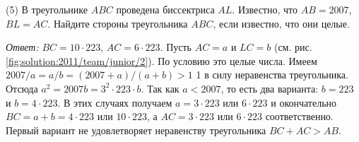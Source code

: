 \textsf{(5)}
В треугольнике $ABC$ проведена биссектриса $AL$.
Известно, что $AB = 2007$, $BL = AC$.
Найдите стороны треугольника $ABC$, если известно, что они целые.

%
\label{solution:2011/team/junior/2}%
\emph{Ответ:} $BC = 10 \cdot 223$, $AC = 6 \cdot 223$.
Пусть $AC = a$ и $LC = b$
(см. рис. \ref{fig:solution:2011/team/junior/2}).
По условию это целые числа.
Имеем $2007 / a = a / b = (2007 + a) / (a + b) > 1$ 1 в силу неравенства
треугольника.
Отсюда $a^2 = 2007 b = 3^2 \cdot 223 \cdot b$.
Так как  $a < 2007$, то есть два варианта:
$b = 223$ и $b = 4 \cdot 223$.
В этих случаях получаем $a = 3 \cdot 223$ или $6 \cdot 223$ и окончательно
$BC = a + b = 4 \cdot 223$ или $10 \cdot 223$, а $AC = 3 \cdot 223$ или
$6 \cdot 223$ соответственно.
Первый вариант не удовлетворяет неравенству треугольника $BC + AC > AB$.

